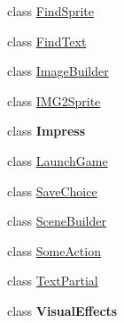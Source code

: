 \begin{DoxyCompactItemize}
class \hyperlink{classAssets_1_1StoryTemplate_1_1Infrastructure_1_1FindSprite}{Find\+Sprite}
\item 
class \hyperlink{classAssets_1_1StoryTemplate_1_1Infrastructure_1_1FindText}{Find\+Text}
\item 
class \hyperlink{classAssets_1_1StoryTemplate_1_1Infrastructure_1_1ImageBuilder}{Image\+Builder}
\item 
class \hyperlink{classAssets_1_1StoryTemplate_1_1Infrastructure_1_1IMG2Sprite}{I\+M\+G2\+Sprite}
\item 
class {\bfseries Impress}
\item 
class \hyperlink{classAssets_1_1StoryTemplate_1_1Infrastructure_1_1LaunchGame}{Launch\+Game}
\item 
class \hyperlink{classAssets_1_1StoryTemplate_1_1Infrastructure_1_1SaveChoice}{Save\+Choice}
\item 
class \hyperlink{classAssets_1_1StoryTemplate_1_1Infrastructure_1_1SceneBuilder}{Scene\+Builder}
\item 
class \hyperlink{classAssets_1_1StoryTemplate_1_1Infrastructure_1_1SomeAction}{Some\+Action}
\item 
class \hyperlink{classAssets_1_1StoryTemplate_1_1Infrastructure_1_1TextPartial}{Text\+Partial}
\item 
class {\bfseries Visual\+Effects}
\end{DoxyCompactItemize}
